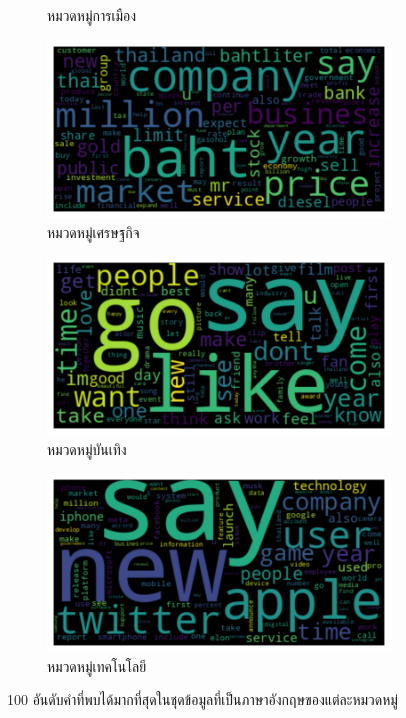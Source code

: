 \documentclass[12pt,oneside,openright,a4paper]{cpe-thai-project}
\begin{document}
\begin{itemize}
\begin{figure}[!ht]
\begin{subfigure}{0.49\textwidth}
            \caption{หมวดหมู่การเมือง}
            \label{fig:subim_eng3}
          \end{subfigure}
          \begin{subfigure}{0.49\textwidth}
            \includegraphics[width=\linewidth]{./img/eng_stat/bus_wc.png} 
            \caption{หมวดหมู่เศรษฐกิจ}
            \label{fig:subim_eng4}
          \end{subfigure}
          \begin{subfigure}{0.49\textwidth}
            \includegraphics[width=\linewidth]{./img/eng_stat/ent_wc.png} 
            \caption{หมวดหมู่บันเทิง}
            \label{fig:subim_eng5}
          \end{subfigure}
          \begin{subfigure}{0.49\textwidth}
            \includegraphics[width=\linewidth]{./img/eng_stat/tech_wc.png} 
            \caption{หมวดหมู่เทคโนโลยี}
            \label{fig:subim_eng6}
          \end{subfigure}
          \caption{100 อันดับคำที่พบได้มากที่สุดในชุดข้อมูลที่เป็นภาษาอังกฤษของแต่ละหมวดหมู่}
          \label{fig:tag_wc_eng}
        \end{figure}
        

\end{itemize}
\end{document}
